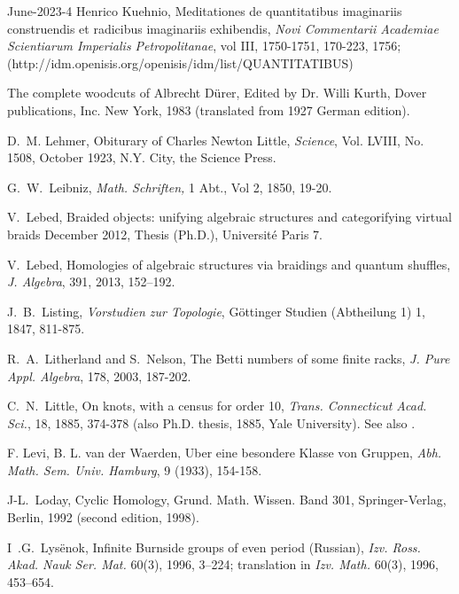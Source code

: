\documentclass[12pt]{amsart}
\begin{document}
\begin{thebibliography}{June-2023-4}
Henrico Kuehnio, Meditationes de quantitatibus imaginariis
construendis et radicibus imaginariis exhibendis, {\it Novi Commentarii Academiae
Scientiarum Imperialis Petropolitanae}, vol III, 1750-1751, 170-223, 1756;\\
(http://idm.openisis.org/openisis/idm/list/QUANTITATIBUS)

The complete woodcuts of Albrecht D\"urer, Edited by Dr. Willi Kurth,
Dover publications, Inc. New York, 1983 (translated from
1927 German edition).

D.~M. Lehmer, Obiturary of Charles Newton Little,
{\it Science}, Vol. LVIII, No. 1508, October
1923, N.Y. City, the Science Press.

G.~W.~Leibniz,  {\it  Math. Schriften,}  1 Abt.,  Vol 2, 1850, 19-20.

V.~Lebed,
Braided objects: unifying algebraic structures and categorifying virtual
braids December 2012, Thesis (Ph.D.), Universit\'e Paris 7.

V.~Lebed, Homologies of algebraic structures via braidings and quantum
shuffles, {\it J. Algebra}, 391, 2013, 152–192.


J.~B.~Listing,  {\it  Vorstudien zur Topologie},  G\"ottinger Studien
(Abtheilung 1) 1, 1847,  811-875.

R.~A.~Litherland and S.~Nelson, The Betti numbers of some finite racks,
{\it J. Pure Appl. Algebra}, 178, 2003, 187-202.

C.~N.~Little, On knots, with a census for order 10, {\it Trans. Connecticut
Acad. Sci.}, 18, 1885, 374-378 (also Ph.D. thesis, 1885, Yale University).
 See also \cite{HoPrz}.

 F. Levi, B. L. van der Waerden, Uber eine besondere
Klasse von Gruppen, \textit{Abh. Math. Sem. Univ. Hamburg}, 9 (1933),
154-158.

J-L.~Loday, Cyclic Homology, Grund. Math. Wissen.
Band 301, Springer-Verlag, Berlin, 1992 (second edition, 1998).

 I~.G.~Lys\"{e}nok, Infinite Burnside groups of even
period (Russian), \textit{Izv. Ross. Akad. Nauk Ser. Mat.} 60(3), 1996,
3--224; translation in \textit{Izv. Math.} 60(3), 1996, 453--654.


\end{thebibliography}
\end{document}
